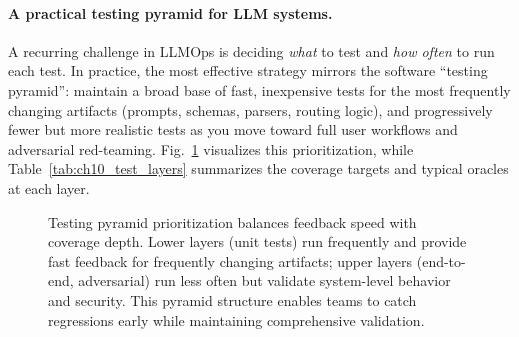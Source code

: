 \paragraph{A practical testing pyramid for LLM systems.}
A recurring challenge in LLMOps is deciding \emph{what} to test and \emph{how often} to run each test. In practice, the most effective strategy mirrors the software ``testing pyramid'': maintain a broad base of fast, inexpensive tests for the most frequently changing artifacts (prompts, schemas, parsers, routing logic), and progressively fewer but more realistic tests as you move toward full user workflows and adversarial red-teaming.
Fig.~\ref{fig:ch10_testing_pyramid} visualizes this prioritization, while Table~\ref{tab:ch10_test_layers} summarizes the coverage targets and typical oracles at each layer.

\begin{figure}[t]
\centering
\begin{llmfigbox}
\end{llmfigbox}
\caption{Testing pyramid prioritization balances feedback speed with coverage depth. Lower layers (unit tests) run frequently and provide fast feedback for frequently changing artifacts; upper layers (end-to-end, adversarial) run less often but validate system-level behavior and security. This pyramid structure enables teams to catch regressions early while maintaining comprehensive validation.}
\label{fig:ch10_testing_pyramid}
\end{figure}

